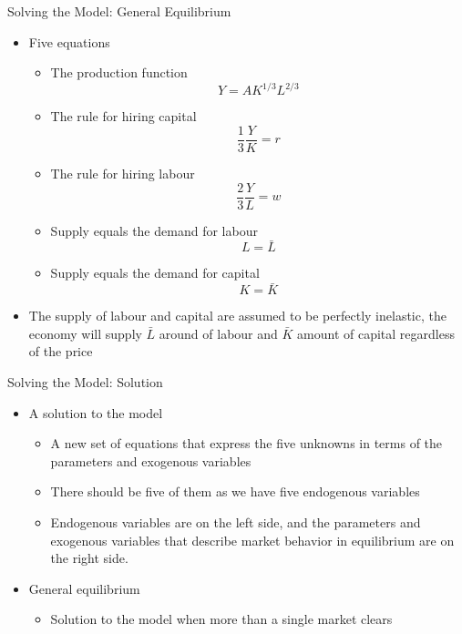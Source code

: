 \documentclass[aspectratio=1610]{beamer}
\begin{document}
\begin{frame}[wide]{Solving the Model: General Equilibrium}
	\begin{itemize}
		\item Five equations
		\begin{itemize}
			\item The production function
			\[Y=AK^{1/3}L^{2/3}\]
			\item The rule for hiring capital
			\[\frac{1}{3}\frac{Y}{K} = r\]
			\item The rule for hiring labour
			\[\frac{2}{3}\frac{Y}{L} = w\]
			\item Supply equals the demand for labour
			\[L = \bar{L}\]
			\item Supply equals the demand for capital
			\[K = \bar{K}\]
		\end{itemize}
	\item The supply of labour and capital are assumed to be perfectly inelastic, the economy will supply $\bar{L}$ around of labour and $\bar{K}$ amount of capital regardless of the price
	\end{itemize}
\end{frame}

\begin{frame}[wide]{Solving the Model: Solution}
	\begin{itemize}
		\item 	A solution to the model
		\begin{itemize}
			\item A new set of equations that express the five unknowns in terms of the parameters and exogenous variables
			\item There should be five of them as we have five endogenous variables
			\item Endogenous variables are on the left side, and the parameters and exogenous variables that describe market behavior in equilibrium are on the right side.
			
		\end{itemize}
		\item General equilibrium
		\begin{itemize}
			\item Solution to the model when more than a single market clears
		\end{itemize}
		
	\end{itemize}
\end{frame}
\end{document}
